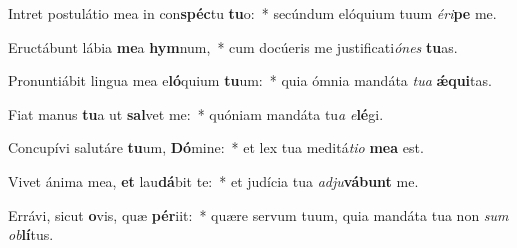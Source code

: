 \item Intret postulátio mea in con\textbf{spéc}tu \textbf{tu}o:~* secúndum elóquium tuum \textit{é}\textit{ri}\textbf{pe} me.
\item Eructábunt lábia \textbf{me}a \textbf{hym}num,~* cum docúeris me justificati\textit{ó}\textit{nes} \textbf{tu}as.
\item Pronuntiábit lingua mea e\textbf{ló}quium \textbf{tu}um:~* quia ómnia mandáta \textit{tu}\textit{a} \textbf{ǽ}\textbf{qui}tas.
\item Fiat manus \textbf{tu}a ut \textbf{sal}vet me:~* quóniam mandáta tu\textit{a} \textit{e}\textbf{lé}gi.
\item Concupívi salutáre \textbf{tu}um, \textbf{Dó}mine:~* et lex tua meditá\textit{ti}\textit{o} \textbf{me}\textbf{a} est.
\item Vivet ánima mea, \textbf{et} lau\textbf{dá}bit te:~* et judícia tua \textit{ad}\textit{ju}\textbf{vá}\textbf{bunt} me.
\item Errávi, sicut \textbf{o}vis, quæ \textbf{pér}iit:~* quære servum tuum, quia mandáta tua non \textit{sum} \textit{ob}\textbf{lí}tus.
